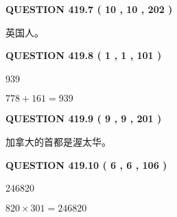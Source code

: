 \documentclass{ctexart}
\begin{document}
{\textbf{\Large{QUESTION
419.7 
 ( 10 , 10 , 202 )
}}}
  
  
 
 
\noindent{}
 
 
英国人。
 
 
 
 
  
\vspace{0.2in}
  
{\textbf{\Large{QUESTION
419.8 
 ( 1 , 1 , 101 )
}}}
  
  
 
 
\noindent{}

939
 
 
 
 
\noindent{}

$ %
778 +  %
161=   %
939$
 
 
  
\vspace{0.2in}
  
{\textbf{\Large{QUESTION
419.9 
 ( 9 , 9 , 201 )
}}}
  
  
 
 
\noindent{}
 
 
加拿大的首都是渥太华。
 
 
 
 
  
\vspace{0.2in}
  
{\textbf{\Large{QUESTION
419.10 
 ( 6 , 6 , 106 )
}}}
  
  
 
 
\noindent{}

246820
 
 
 
 
\noindent{}

$ %
820 \times  %
301=   %
246820$
 
 
   
   
 \vspace{0.2in}
 
   
   
\end{document}
